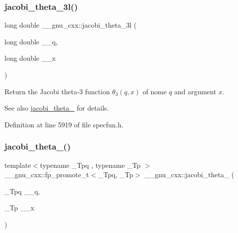 \subsubsection{\texorpdfstring{jacobi\+\_\+theta\+\_\+3l()}{jacobi\_theta\_3l()}}
{\footnotesize\ttfamily long double \+\_\+\+\_\+gnu\+\_\+cxx\+::jacobi\+\_\+theta\+\_\+3l (\begin{DoxyParamCaption}\item[{long double}]{\+\_\+\+\_\+q,  }\item[{long double}]{\+\_\+\+\_\+x }\end{DoxyParamCaption})\hspace{0.3cm}{\ttfamily [inline]}}

Return the Jacobi theta-\/3 function $ \theta_3(q,x) $ of nome $ q $ and argument $ x $.

\begin{DoxySeeAlso}{See also}
\hyperlink{group__gnu__math__spec__func_gaf4eac2990db1dadba66ae688ceaa6403}{jacobi\+\_\+theta\+\_} for details. 
\end{DoxySeeAlso}


Definition at line 5919 of file specfun.\+h.

\mbox{\label{group__gnu__math__spec__func_ga676501b6284d5702a3dc61252e6c78ab}} 
\subsubsection{\texorpdfstring{jacobi\+\_\+theta\+\_()}{jacobi\_theta\_4()}}
{\footnotesize\ttfamily template$<$typename \+\_\+\+Tpq , typename \+\_\+\+Tp $>$ \\
\+\_\+\+\_\+gnu\+\_\+cxx\+::fp\+\_\+promote\+\_\+t$<$\+\_\+\+Tpq, \+\_\+\+Tp$>$ \+\_\+\+\_\+gnu\+\_\+cxx\+::jacobi\+\_\+theta\+\_ (\begin{DoxyParamCaption}\item[{\+\_\+\+Tpq}]{\+\_\+\+\_\+q,  }\item[{\+\_\+\+Tp}]{\+\_\+\+\_\+x }\end{DoxyParamCaption})\hspace{0.3cm}{\ttfamily [inline]}}

